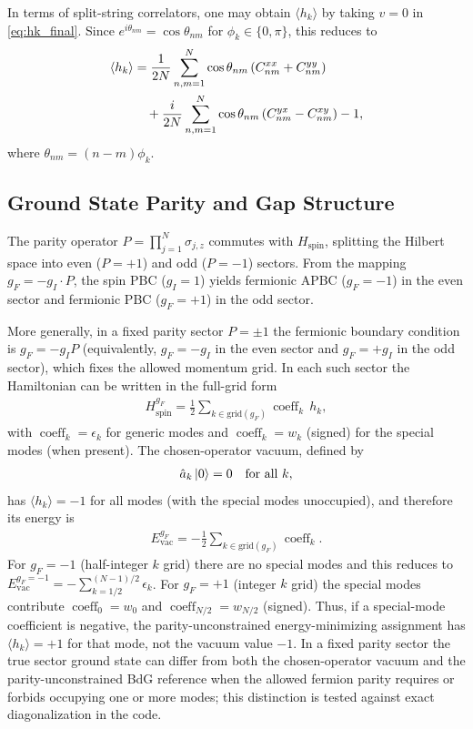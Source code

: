 \documentclass[aps,prx,twocolumn,superscriptaddress,nofootinbib,nolongbibliography,nobalancelastpage,10pt,floatfix]{revtex4-2}
\begin{document}
In terms of split-string correlators, one may obtain $\langle h_k\rangle$ by taking $v=0$ in \cref{eq:hk_final}.
Since $e^{i\theta_{nm}}=\cos\theta_{nm}$ for $\phi_k\in\{0,\pi\}$, this reduces to
\begin{align}
    \langle h_k\rangle
    &= \frac{1}{2N}\sum_{n,m=1}^N
       \cos\theta_{nm}\left(C^{xx}_{nm}+C^{yy}_{nm}\right)\nonumber\\
    &\quad
      + \frac{i}{2N}\sum_{n,m=1}^N
        \cos\theta_{nm}\left(C^{yx}_{nm}-C^{xy}_{nm}\right) - 1,
\end{align}
where $\theta_{nm}=(n-m)\phi_k$.

\subsection{Ground State Parity and Gap Structure}

The parity operator $P = \prod_{j=1}^{N} \sigma_{j,z}$ commutes with $H_{\mathrm{spin}}$, splitting the Hilbert space into even ($P = +1$) and odd ($P = -1$) sectors. From the mapping $g_F = -g_I \cdot P$, the spin PBC ($g_I = 1$) yields fermionic APBC ($g_F = -1$) in the even sector and fermionic PBC ($g_F = +1$) in the odd sector.

More generally, in a fixed parity sector $P=\pm 1$ the fermionic boundary condition is $g_F=-g_I P$ (equivalently, $g_F=-g_I$ in the even sector and $g_F=+g_I$ in the odd sector), which fixes the allowed momentum grid. In each such sector the Hamiltonian can be written in the full-grid form
\begin{align}
    H_{\mathrm{spin}}^{g_F} = \frac{1}{2}\sum_{k\in\mathrm{grid}(g_F)} \operatorname{coeff}_k\, h_k,
\end{align}
with $\operatorname{coeff}_k=\epsilon_k$ for generic modes and $\operatorname{coeff}_k=w_k$ (signed) for the special modes (when present). The chosen-operator vacuum, defined by
\begin{align}
    \hat{a}_k\ket{0} = 0 \quad \text{for all } k,
\end{align}
has $\langle h_k\rangle=-1$ for all modes (with the special modes unoccupied), and therefore its energy is
\begin{align}
    E_{\mathrm{vac}}^{g_F} = -\frac{1}{2}\sum_{k\in\mathrm{grid}(g_F)} \operatorname{coeff}_k.
\end{align}
For $g_F=-1$ (half-integer $k$ grid) there are no special modes and this reduces to $E_{\mathrm{vac}}^{g_F=-1}=-\sum_{k=1/2}^{(N-1)/2}\epsilon_k$. For $g_F=+1$ (integer $k$ grid) the special modes contribute $\operatorname{coeff}_0=w_0$ and $\operatorname{coeff}_{N/2}=w_{N/2}$ (signed). Thus, if a special-mode coefficient is negative, the parity-unconstrained energy-minimizing assignment has $\langle h_k\rangle=+1$ for that mode, not the vacuum value $-1$. In a fixed parity sector the true sector ground state can differ from both the chosen-operator vacuum and the parity-unconstrained BdG reference when the allowed fermion parity requires or forbids occupying one or more modes; this distinction is tested against exact diagonalization in the code.
\end{document}
